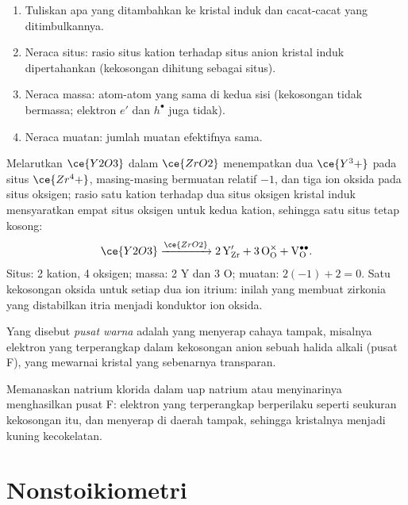 \begin{method}\label{met:b3:solid-state:kroger-vink}
\begin{enumerate}
  \item Tuliskan apa yang ditambahkan ke kristal induk dan cacat-cacat yang ditimbulkannya.
  \item Neraca situs: rasio situs kation terhadap situs anion kristal induk dipertahankan
        (kekosongan dihitung sebagai situs).
  \item Neraca massa: atom-atom yang sama di kedua sisi (kekosongan tidak bermassa;
        elektron $e'$ dan  $h^\bullet$ juga tidak).
  \item Neraca muatan: jumlah muatan efektifnya sama.
\end{enumerate}
\end{method}

\begin{example}
Melarutkan $\ce{Y2O3}$ dalam $\ce{ZrO2}$ menempatkan dua $\ce{Y^3+}$ pada situs $\ce{Zr^4+}$, masing-masing bermuatan relatif $-1$, dan
tiga ion oksida pada situs oksigen; rasio satu kation terhadap dua situs oksigen kristal induk
mensyaratkan empat situs oksigen untuk kedua kation, sehingga satu situs tetap kosong:
\[
  \ce{Y2O3} \xrightarrow{\ce{ZrO2}} \mathrm{2\,Y_{Zr}' + 3\,O_O^{\times} + V_O^{\bullet\bullet}}.
\]
Situs: 2 kation, 4 oksigen; massa: 2 Y dan 3 O; muatan: $2(-1) + 2 = 0$. Satu kekosongan
oksida untuk setiap dua ion itrium: inilah yang membuat zirkonia yang distabilkan itria
menjadi konduktor ion oksida.
\end{example}

\begin{definition}\label{def:b3:solid-state:colour-centre}
Yang disebut \emph{pusat warna} adalah  yang menyerap
cahaya tampak, misalnya elektron yang terperangkap dalam kekosongan anion sebuah halida
alkali (pusat F), yang mewarnai kristal yang sebenarnya transparan.
\end{definition}

Memanaskan natrium klorida dalam uap natrium atau menyinarinya menghasilkan pusat F:
elektron yang terperangkap berperilaku seperti  seukuran kekosongan itu, dan
menyerap di daerah tampak, sehingga kristalnya menjadi kuning kecokelatan.

\section{Nonstoikiometri}

